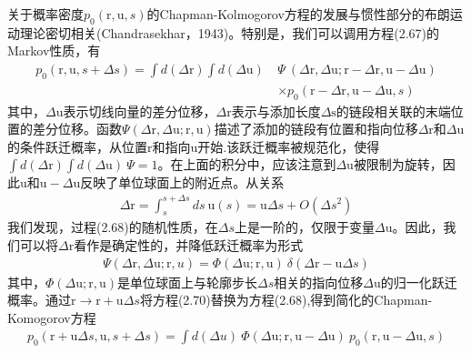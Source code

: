关于概率密度$p_0(\mathrm{r},\mathrm{u},s)$的Chapman-Kolmogorov方程的发展与惯性部分的布朗运动理论密切相关(Chandrasekhar，1943)。特别是，我们可以调用方程(2.67)的Markov性质，有\\
\begin{equation}
\begin{aligned}
p_0(\mathrm{r},\mathrm{u},s+\Delta s)=\int d(\Delta \mathrm{r})\int d(\Delta \mathrm{u})\ &\Psi\  (\Delta \mathrm{r},\Delta \mathrm{u};\mathrm{r}-\Delta \mathrm{r},\mathrm{u}-\Delta \mathrm{u})\\ &\times p_0(\mathrm{r}-\Delta \mathrm{r},\mathrm{u}-\Delta \mathrm{u},s)
\end{aligned}
\end{equation}
其中，$\Delta\mathrm{u}$表示切线向量的差分位移，$\Delta \mathrm{r}$表示与添加长度$\Delta \mathrm{s}$的链段相关联的末端位置的差分位移。函数$\Psi(\Delta \mathrm{r},\Delta \mathrm{u};\mathrm{r},\mathrm{u})$描述了添加的链段有位置和指向位移$\Delta \mathrm{r}$和$\Delta \mathrm{u}$的条件跃迁概率，从位置$\mathrm{r}$和指向$\mathrm{u}$开始.该跃迁概率被规范化，使得$\int d(\Delta \mathrm{r})\int d(\Delta \mathrm{u})\ \Psi=1$。在上面的积分中，应该注意到$\Delta\mathrm{u}$被限制为旋转，因此$\mathrm{u}$和$\mathrm{u}-\Delta \mathrm{u}$反映了单位球面上的附近点。从关系\\
\begin{gather}
\Delta \mathrm{r} = \int_{s}^{s+\Delta s}ds\ \mathrm{u}(s)
= \mathrm{u}\Delta s +O(\Delta s ^2)
\end{gather}
我们发现，过程(2.68)的随机性质，在$\Delta s$上是一阶的，仅限于变量$\Delta \mathrm{u}$。因此，我们可以将$\Delta \mathrm{r}$看作是确定性的，并降低跃迁概率为形式\\
\begin{gather}
\Psi(\Delta \mathrm{r} ,\Delta \mathrm{u} ;\mathrm{r},u)=\Phi(\Delta \mathrm{u};\mathrm{r},\mathrm{u})\ \delta(\Delta \mathrm{r}-\mathrm{u}\Delta s)
\end{gather}
其中，$\Phi(\Delta \mathrm{u};\mathrm{r},\mathrm{u})$是单位球面上与轮廓步长$\Delta s$相关的指向位移$\Delta \mathrm{u}$的归一化跃迁概率。通过$\mathrm{r}\longrightarrow \mathrm{r}+\mathrm{u}\Delta s$将方程(2.70)替换为方程(2.68),得到简化的Chapman-Komogorov方程\\
\begin{gather}
p_0(\mathrm{r}+\mathrm{u}\Delta s,\mathrm{u},s+\Delta s)=\int d (\Delta u)\ \Phi(\Delta \mathrm{u} ;\mathrm{r},\mathrm{u}-\Delta \mathrm{u})\ p_0(\mathrm{r},\mathrm{u}-\Delta \mathrm{u},s)
\end{gather}

